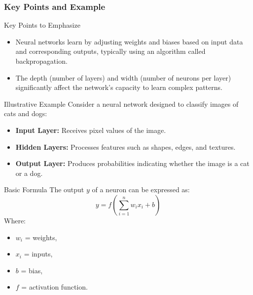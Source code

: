 \documentclass[aspectratio=169]{beamer}
\begin{document}
\begin{frame}[fragile]
    \frametitle{Key Points and Example}
    
    \begin{block}{Key Points to Emphasize}
        \begin{itemize}
            \item Neural networks learn by adjusting weights and biases based on input data and corresponding outputs, typically using an algorithm called backpropagation.
            \item The depth (number of layers) and width (number of neurons per layer) significantly affect the network's capacity to learn complex patterns.
        \end{itemize}
    \end{block}
    
    \begin{block}{Illustrative Example}
        Consider a neural network designed to classify images of cats and dogs:
            \begin{itemize}
                \item \textbf{Input Layer:} Receives pixel values of the image.
                \item \textbf{Hidden Layers:} Processes features such as shapes, edges, and textures.
                \item \textbf{Output Layer:} Produces probabilities indicating whether the image is a cat or a dog.
            \end{itemize}
    \end{block}
    
    \begin{block}{Basic Formula}
        The output \( y \) of a neuron can be expressed as:
        \begin{equation}
            y = f\left(\sum_{i=1}^{n} w_i x_i + b\right)
        \end{equation}
        Where:
        \begin{itemize}
            \item \( w_i \) = weights,
            \item \( x_i \) = inputs,
            \item \( b \) = bias,
            \item \( f \) = activation function.
        \end{itemize}
    \end{block}
\end{frame}
\end{document}
